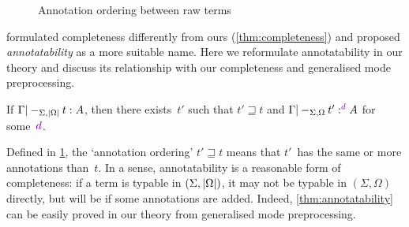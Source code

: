 \begin{figure}
  \centering\small
  
  \caption{Annotation ordering between raw terms}
  \label{fig:annotation-ordering}
\end{figure}

\citet{Dunfield2021} formulated completeness differently from ours (\cref{thm:completeness}) and proposed \emph{annotatability} as a more suitable name.
Here we reformulate annotatability in our theory and discuss its relationship with our completeness and generalised mode preprocessing.

\begin{proposition}[Annotatability]\label{thm:annotatability}
If\/ $\Gamma |-_{\Sigma,\left|\Omega\right|} t : A$, then there exists~$t'$ such that\/ $t' \sqsupseteq t$ and $\Gamma |-_{\Sigma,\Omega} t' :^\dir{d} A$ for some~$\dir{d}$.
\end{proposition}

Defined in \cref{fig:annotation-ordering}, the `annotation ordering' $t' \sqsupseteq t$ means that $t'$~has the same or more annotations than~$t$.
In a sense, annotatability is a reasonable form of completeness: if a term is typable in $(\Sigma, \left|\Omega\right|)$, it may not be typable in $(\Sigma, \Omega)$ directly, but will be if some annotations are added.
Indeed, \cref{thm:annotatability} can be easily proved in our theory from generalised mode preprocessing.

